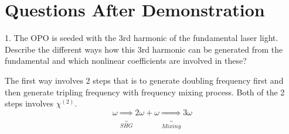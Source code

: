 \documentclass{article}
\begin{document}
\section{Questions After Demonstration}
1. The OPO is seeded with the 3rd harmonic of the fundamental laser light. Describe the different ways how this 3rd harmonic can be generated from the fundamental and which nonlinear coefficients are involved in these?\par 
The first way involves 2 steps that is to generate doubling frequency first and then generate tripling frequency with frequency mixing process. Both of the 2 steps involves $\chi^{(2)}$.
\begin{equation*}
\omega \underbrace{\Longrightarrow}_{SHG} 2\omega +\omega \underbrace{\Longrightarrow}_{Mixing} 3\omega
\end{equation*} \\
\end{document}

